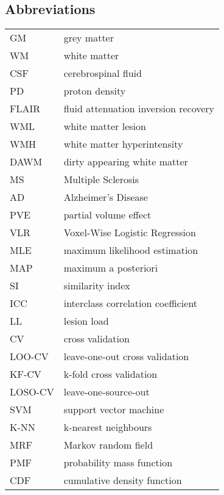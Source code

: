 \begin{singlespacing}
{\setlength{\parskip}{7pt}
  \tableofcontents
  \newpage
  \listoffigures
  \newpage
  \listoftables
  \newpage
}
\subsection*{Abbreviations}
\begin{table}[H]
  \begin{tabular}{ll}
  	\toprule
  	GM      & grey matter                          \\
  	WM      & white matter                         \\
  	CSF     & cerebrospinal fluid                  \\
  	PD      & proton density                       \\
  	FLAIR   & fluid attenuation inversion recovery \\
  	WML     & white matter lesion                  \\
  	WMH     & white matter hyperintensity          \\
  	DAWM    & dirty appearing white matter         \\
  	MS      & Multiple Sclerosis                   \\
  	AD      & Alzheimer's Disease                  \\
  	PVE     & partial volume effect                \\
  	VLR     & Voxel-Wise Logistic Regression       \\
  	MLE     & maximum likelihood estimation        \\
  	MAP     & maximum a posteriori                 \\
  	SI      & similarity index                     \\
  	ICC     & interclass correlation coefficient   \\
  	LL      & lesion load                          \\
  	CV      & cross validation                     \\
  	LOO-CV  & leave-one-out cross validation       \\
  	KF-CV   & k-fold cross validation              \\
  	LOSO-CV & leave-one-source-out                 \\
  	SVM     & support vector machine               \\
  	K-NN    & k-nearest neighbours                 \\
  	MRF     & Markov random field                  \\
    PMF     & probability mass function            \\
    CDF     & cumulative density function          \\ \bottomrule
  \end{tabular}
\end{table}
\clearpage

\end{singlespacing}
